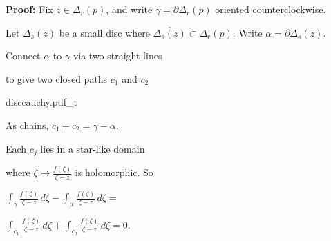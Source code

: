\documentclass[10pt,aspectratio=169]{beamer}
\begin{document}
\begin{frame}
\textbf{Proof:}
Fix $z \in \Delta_r(p)$, and write $\gamma = \partial \Delta_r(p)$ oriented counterclockwise.

\medskip
\pause

Let $\Delta_s(z)$ be a small disc where $\overline{\Delta_s(z)} \subset
\Delta_r(p)$.
\pause
Write $\alpha = \partial \Delta_s(z)$.

\pause
\medskip

Connect $\alpha$ to $\gamma$
via two straight lines

to give two closed paths
$c_1$ and $c_2$

\vspace*{-0.35in}
\hspace*{2.6in}%
{disccauchy.pdf_t}

\pause
\vspace*{-1.8in}

As chains, $c_1+c_2 = \gamma - \alpha$.

\medskip
\pause

Each $c_j$ lies in a star-like domain

where $\displaystyle \zeta \mapsto \frac{f(\zeta)}{\zeta-z}$ is holomorphic.
\pause
So

\medskip

$
\displaystyle
\int_{\gamma} \frac{f(\zeta)}{\zeta-z} \, d\zeta -
\int_{\alpha} \frac{f(\zeta)}{\zeta-z} \, d\zeta =
$
\medskip

\hspace*{0.7in}
$
\displaystyle
\int_{c_1} \frac{f(\zeta)}{\zeta-z} \, d\zeta + 
\int_{c_2} \frac{f(\zeta)}{\zeta-z} \, d\zeta = 0 .
$

\end{frame}
\end{document}
